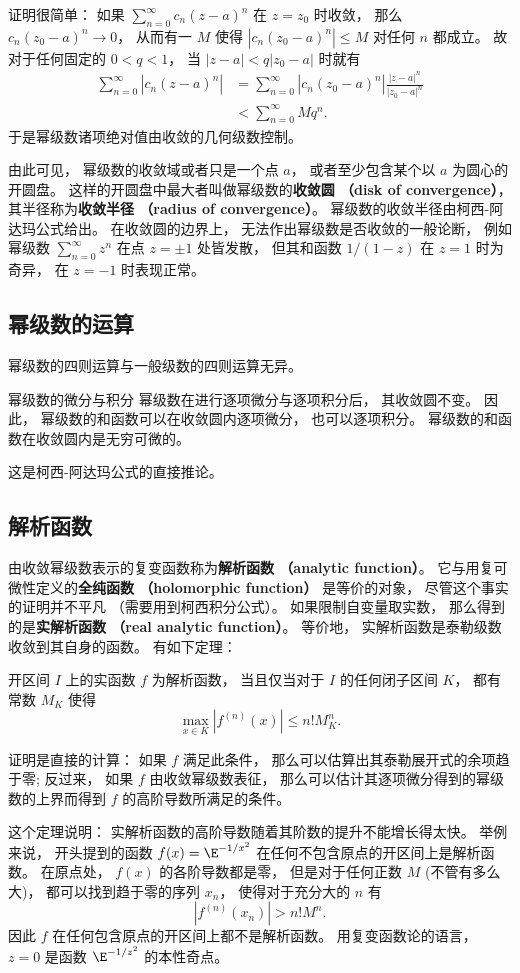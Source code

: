 证明很简单： 如果 $\sum_{n=0}^\infty c_n(z-a)^n$ 在 $z=z_0$ 时收敛， 那么 $c_n(z_0-a)^n\to0$， 从而有一 $M$ 使得 $|c_n(z_0-a)^n|\leq M$ 对任何 $n$ 都成立。 故对于任何固定的 $0<q<1$， 当 $|z-a|<q|z_0-a|$ 时就有
$$
\begin{aligned}
\sum_{n=0}^\infty |c_n(z-a)^n|
&=\sum_{n=0}^\infty |c_n(z_0-a)^n|\frac{|z-a|^n}{|z_0-a|^n}\\
&<\sum_{n=0}^\infty Mq^n.
\end{aligned}
$$
于是幂级数诸项绝对值由收敛的几何级数控制。

由此可见， 幂级数的收敛域或者只是一个点 $a$， 或者至少包含某个以 $a$ 为圆心的开圆盘。 这样的开圆盘中最大者叫做幂级数的\textbf{收敛圆 （disk of convergence）}， 其半径称为\textbf{收敛半径 （radius of convergence）}。 幂级数的收敛半径由柯西-阿达玛公式给出。 在收敛圆的边界上， 无法作出幂级数是否收敛的一般论断， 例如幂级数 $\sum_{n=0}^\infty z^n$ 在点 $z=\pm1$ 处皆发散， 但其和函数 $1/(1-z)$ 在 $z=1$ 时为奇异， 在 $z=-1$ 时表现正常。

\subsection{幂级数的运算}
幂级数的四则运算与一般级数的四则运算无异。

\begin{theorem}{幂级数的微分与积分}
幂级数在进行逐项微分与逐项积分后， 其收敛圆不变。 因此， 幂级数的和函数可以在收敛圆内逐项微分， 也可以逐项积分。 幂级数的和函数在收敛圆内是无穷可微的。
\end{theorem}
这是柯西-阿达玛公式的直接推论。 

\subsection{解析函数}
由收敛幂级数表示的复变函数称为\textbf{解析函数 （analytic function）}。 它与用复可微性定义的\textbf{全纯函数 （holomorphic function）} 是等价的对象， 尽管这个事实的证明并不平凡 （需要用到柯西积分公式）。 如果限制自变量取实数， 那么得到的是\textbf{实解析函数 （real analytic function）}。 等价地， 实解析函数是泰勒级数收敛到其自身的函数。 有如下定理：

\begin{theorem}{}
开区间 $I$ 上的实函数 $f$ 为解析函数， 当且仅当对于 $I$ 的任何闭子区间 $K$， 都有常数 $M_K$ 使得
$$
\max_{x\in K}|f^{(n)}(x)|\leq n!M_K^n.
$$
\end{theorem}

证明是直接的计算： 如果 $f$ 满足此条件， 那么可以估算出其泰勒展开式的余项趋于零; 反过来， 如果 $f$ 由收敛幂级数表征， 那么可以估计其逐项微分得到的幂级数的上界而得到 $f$ 的高阶导数所满足的条件。

这个定理说明： 实解析函数的高阶导数随着其阶数的提升不能增长得太快。 举例来说， 开头提到的函数 $f(x)=\E^{-1/x^2}$ 在任何不包含原点的开区间上是解析函数。 在原点处， $f(x)$ 的各阶导数都是零， 但是对于任何正数 $M$ (不管有多么大)， 都可以找到趋于零的序列 $x_n$， 使得对于充分大的 $n$ 有
$$
|f^{(n)}(x_n)|>n!M^n.
$$
因此 $f$ 在任何包含原点的开区间上都不是解析函数。 用复变函数论的语言， $z=0$ 是函数 $\E^{-1/z^2}$ 的本性奇点。


